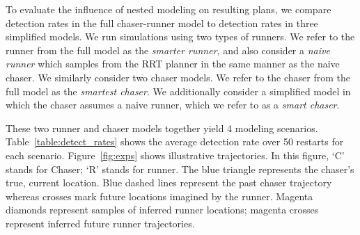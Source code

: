\documentclass[twoside]{article}
\begin{document}
To evaluate the influence of nested modeling on resulting plans, we compare detection rates in the full chaser-runner model to detection rates in three simplified models. %
We run simulations using two types of runners. We refer to the runner from the full model as the \emph{smarter runner}, and also consider a \textit{naive runner} which samples from the RRT planner in the same manner as the naive chaser. We similarly consider two chaser models. We refer to the chaser from the full model as the \emph{smartest chaser}. We additionally consider a simplified model in which the chaser assumes a naive runner, which we refer to as a \emph{smart chaser}. 

These two runner and chaser models together yield 4 modeling scenarios. Table~\ref{table:detect_rates} shows the average detection rate over 50 restarts for each scenario. Figure~\ref{fig:exps} shows illustrative trajectories. In this figure, `C' stands for Chaser; `R' stands for runner.  The blue triangle represents the chaser's true, current location. 
Blue dashed lines represent the past chaser trajectory whereas crosses mark future locations imagined by the runner. 
Magenta diamonds represent samples of inferred runner locations;
magenta crosses represent inferred future runner trajectories.  



 
\end{document}
